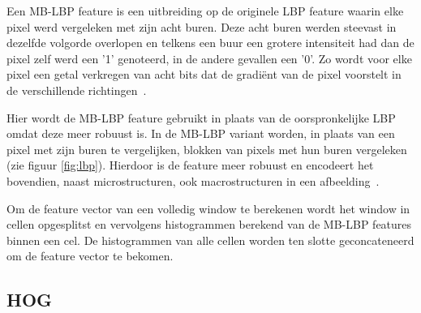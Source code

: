 Een MB-LBP feature is een uitbreiding op de originele LBP feature waarin elke pixel werd vergeleken met zijn acht buren. Deze acht buren werden steevast in dezelfde volgorde overlopen en telkens een buur een grotere intensiteit had dan de pixel zelf werd een '1' genoteerd, in de andere gevallen een '0'. Zo wordt voor elke pixel een getal verkregen van acht bits dat de gradi\"ent van de pixel voorstelt in de verschillende richtingen~\cite{ojala1996comparative}.

Hier wordt de MB-LBP feature gebruikt in plaats van de oorspronkelijke LBP omdat deze meer robuust is. In de MB-LBP variant worden, in plaats van een pixel met zijn buren te vergelijken, blokken van pixels met hun buren vergeleken (zie figuur \ref{fig:lbp}). Hierdoor is de feature meer robuust en encodeert het bovendien, naast microstructuren, ook macrostructuren in een afbeelding~\cite{liao2007learning}. 

Om de feature vector van een volledig window te berekenen wordt het window in cellen opgesplitst en vervolgens histogrammen berekend van de MB-LBP features binnen een cel. De histogrammen van alle cellen worden ten slotte geconcateneerd om de feature vector te bekomen.

%

\subsection{HOG} \label{sec:feat_hog}

